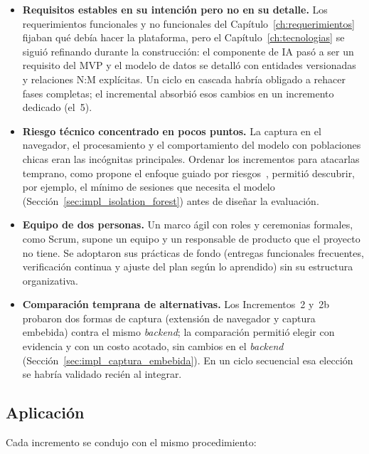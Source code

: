 \begin{itemize}
    \item \textbf{Requisitos estables en su intención pero no en su detalle.} Los requerimientos funcionales y no funcionales del Capítulo~\ref{ch:requerimientos} fijaban qué debía hacer la plataforma, pero el Capítulo~\ref{ch:tecnologias} se siguió refinando durante la construcción: el componente de IA pasó a ser un requisito del MVP y el modelo de datos se detalló con entidades versionadas y relaciones N:M explícitas. Un ciclo en cascada habría obligado a rehacer fases completas; el incremental absorbió esos cambios en un incremento dedicado (el~5).
    \item \textbf{Riesgo técnico concentrado en pocos puntos.} La captura en el navegador, el procesamiento y el comportamiento del modelo con poblaciones chicas eran las incógnitas principales. Ordenar los incrementos para atacarlas temprano, como propone el enfoque guiado por riesgos~\parencite{Boehm1988}, permitió descubrir, por ejemplo, el mínimo de sesiones que necesita el modelo (Sección~\ref{sec:impl_isolation_forest}) antes de diseñar la evaluación.
    \item \textbf{Equipo de dos personas.} Un marco ágil con roles y ceremonias formales, como Scrum, supone un equipo y un responsable de producto que el proyecto no tiene. Se adoptaron sus prácticas de fondo (entregas funcionales frecuentes, verificación continua y ajuste del plan según lo aprendido) sin su estructura organizativa.
    \item \textbf{Comparación temprana de alternativas.} Los Incrementos~2 y~2b probaron dos formas de captura (extensión de navegador y captura embebida) contra el mismo \textit{backend}; la comparación permitió elegir con evidencia y con un costo acotado, sin cambios en el \textit{backend} (Sección~\ref{sec:impl_captura_embebida}). En un ciclo secuencial esa elección se habría validado recién al integrar.
    \end{itemize}

\subsection{Aplicación}

Cada incremento se condujo con el mismo procedimiento:

